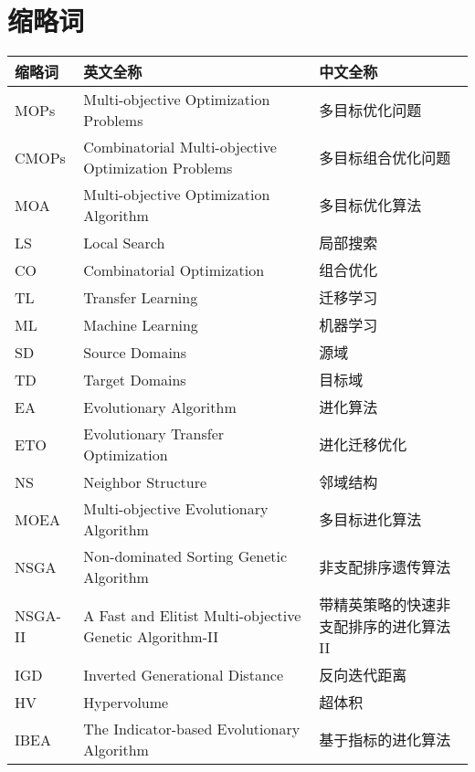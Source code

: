 \chapter*{缩略词}
\label{chap:缩略词}
{
\noindent\begin{longtabu} to \textwidth {|X[1,c]|X[6,c]|X[3,c]|}\hline
缩略词 & 英文全称 & 中文全称 \\ \hline
MOPs & Multi-objective Optimization Problems & 多目标优化问题 \\ \hline
CMOPs & Combinatorial Multi-objective Optimization Problems & 多目标组合优化问题 \\ \hline
MOA & Multi-objective Optimization Algorithm & 多目标优化算法 \\ \hline
LS & Local Search & 局部搜索 \\ \hline
CO & Combinatorial Optimization & 组合优化 \\ \hline
TL & Transfer Learning & 迁移学习 \\ \hline
ML & Machine Learning & 机器学习 \\ \hline
SD & Source Domains & 源域 \\ \hline
TD & Target Domains & 目标域 \\ \hline
EA & Evolutionary Algorithm & 进化算法 \\ \hline
ETO & Evolutionary Transfer Optimization & 进化迁移优化 \\ \hline
NS & Neighbor Structure & 邻域结构 \\ \hline
MOEA & Multi-objective Evolutionary Algorithm & 多目标进化算法 \\ \hline
NSGA & Non-dominated Sorting Genetic Algorithm  & 非支配排序遗传算法\\ \hline
NSGA-II & A Fast and Elitist Multi-objective Genetic Algorithm-II & 带精英策略的快速非支配排序的进化算法II \\ \hline
IGD & Inverted Generational Distance & 反向迭代距离 \\ \hline
HV & Hypervolume & 超体积 \\ \hline
IBEA & The Indicator-based Evolutionary Algorithm & 基于指标的进化算法 \\ \hline

\end{longtabu}}

